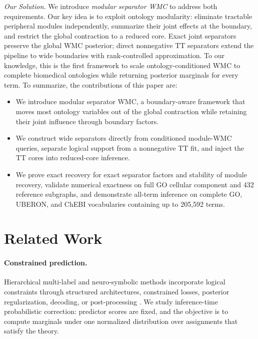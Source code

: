 \documentclass[letterpaper]{article}
\newcommand{\stitle}[1]{\vspace{1mm}\noindent\textit{#1}}
\begin{document}
\stitle{Our Solution.}
We introduce \emph{modular separator WMC} to address both requirements.
Our key idea is to exploit ontology modularity: eliminate tractable
peripheral modules independently, summarize their joint effects at the
boundary, and restrict the global contraction to a reduced core. Exact
joint separators preserve the global WMC posterior; direct nonnegative TT
separators extend the pipeline to wide boundaries with rank-controlled
approximation. To our knowledge, this is the first framework to scale
ontology-conditioned WMC to complete biomedical ontologies while returning
posterior marginals for every term.
To summarize, the contributions of this paper are:
\begin{itemize}
    \item We introduce modular separator WMC, a boundary-aware framework
    that moves most ontology variables out of the global contraction while
    retaining their joint influence through boundary factors.

    \item We construct wide separators directly from conditioned module-WMC
    queries, separate logical support from a nonnegative TT fit, and inject
    the TT cores into reduced-core inference.

    \item We prove exact recovery for exact separator factors and stability
    of module recovery, validate numerical exactness on full GO cellular
    component and 432 reference subgraphs, and demonstrate all-term
    inference on complete GO, UBERON, and ChEBI vocabularies containing up
    to 205,592 terms.
\end{itemize}


\section{Related Work}
\label{sec:related-work}

\paragraph{Constrained prediction.}
Hierarchical multi-label and neuro-symbolic methods incorporate logical
constraints through structured architectures, constrained losses, posterior
regularization, decoding, or post-processing
\citep{silla2011survey,giunchiglia2020chmcnn,ganchev2010posterior,
diligenti2017semantic,xu2018semanticloss,wang2023regularization,
ahmed2022spl}. We study inference-time probabilistic correction: predictor
scores are fixed, and the objective is to compute marginals under one
normalized distribution over assignments that satisfy the theory.
\end{document}
